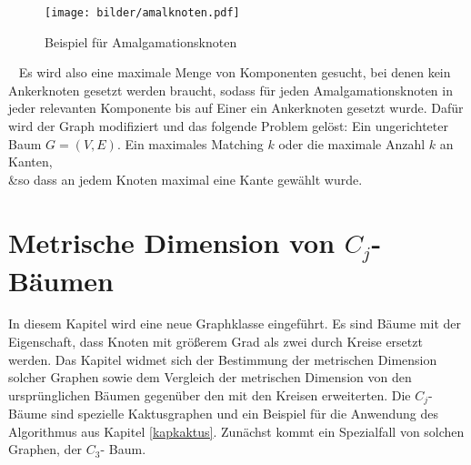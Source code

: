 \begin{figure}[h!]
		\centering 		 
   \texttt{[image: bilder/amalknoten.pdf]}
	\caption{Beispiel für Amalgamationsknoten}
  	 \end{figure}
  	 ~\linebreak
Es wird also eine maximale Menge von Komponenten gesucht, bei denen kein Ankerknoten gesetzt werden braucht, sodass für jeden Amalgamationsknoten in jeder relevanten Komponente bis auf Einer ein Ankerknoten gesetzt wurde. Dafür wird der Graph modifiziert und das folgende Problem gelöst:
\vspace{-1mm}
{Ein ungerichteter Baum $G=(V,E)$.}
{Ein maximales Matching $k$ oder die maximale Anzahl $k$ an Kanten,\\&so dass an jedem Knoten maximal eine Kante gewählt wurde.}

\newpage
\chapter{Metrische Dimension von $C_j$- Bäumen}
\label{kapcjbaume}
\vspace{-2mm}
In diesem Kapitel wird eine neue Graphklasse eingeführt. Es sind Bäume mit der Eigenschaft, dass Knoten mit größerem Grad als zwei durch Kreise ersetzt werden. Das Kapitel widmet sich der Bestimmung der metrischen Dimension solcher Graphen sowie dem Vergleich der metrischen Dimension von den ursprünglichen Bäumen gegenüber den mit den Kreisen erweiterten. Die $C_j$- Bäume sind spezielle Kaktusgraphen und ein Beispiel für die Anwendung des Algorithmus aus Kapitel \ref{kapkaktus}. Zunächst kommt ein Spezialfall von solchen Graphen, der $C_3$- Baum.
\vspace{-3mm}
